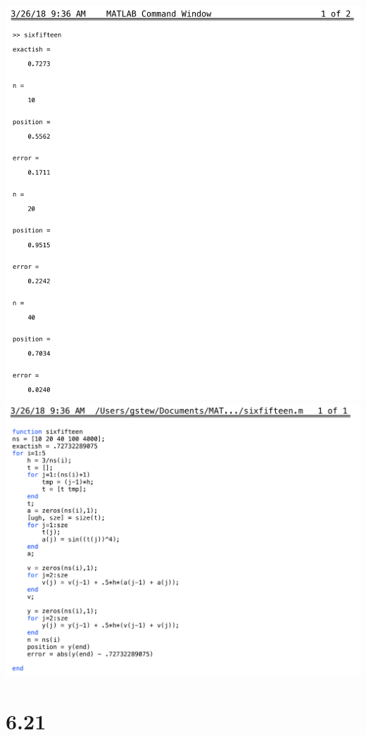 \documentclass{article}
\begin{document}
\bigskip

\includegraphics[width=\textwidth]{output.png}
\includegraphics[width=\textwidth]{code.png}

\section*{6.21}
\end{document}
